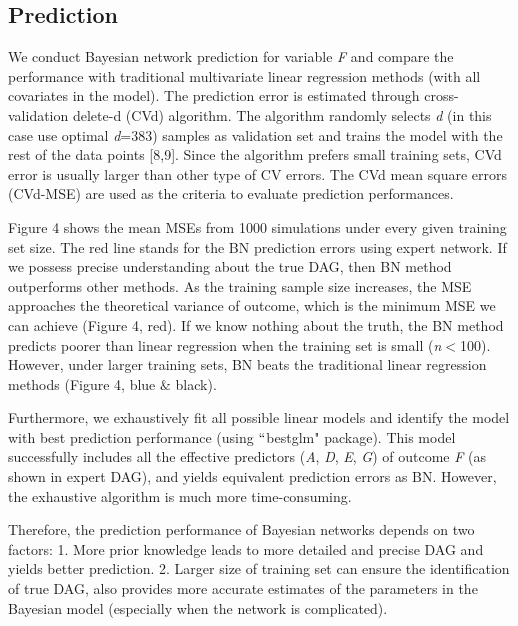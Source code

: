 \documentclass{article}
\begin{document}
\subsection{Prediction}
We conduct Bayesian network prediction for variable \textit{F} and compare the performance with traditional multivariate linear regression methods (with all covariates in the model). The prediction error is estimated through cross-validation delete-d (CVd) algorithm. The algorithm randomly selects \textit{d} (in this case use optimal \textit{d}=383) samples as validation set and trains the model with the rest of the data points [8,9]. Since the algorithm prefers small training sets, CVd error is usually larger than other type of CV errors. The CVd mean square errors (CVd-MSE) are used as the criteria to evaluate prediction performances. \par

Figure 4 shows the mean MSEs from 1000 simulations under every given training set size. The red line stands for the BN prediction errors using expert network. If we possess precise understanding about the true DAG, then BN method outperforms other methods. As the training sample size increases, the MSE approaches the theoretical variance of outcome, which is the minimum MSE we can achieve (Figure 4, red). If we know nothing about the truth, the BN method predicts poorer than linear regression when the training set is small (\textit{n}$<$100). However, under larger training sets, BN beats the traditional linear regression methods (Figure 4, blue $\&$ black). \par

Furthermore, we exhaustively fit all possible linear models and identify the model with best prediction performance (using $``$bestglm" package). This model successfully includes all the effective predictors (\textit{A}, \textit{D}, \textit{E}, \textit{G}) of outcome \textit{F} (as shown in expert DAG), and yields equivalent prediction errors as BN. However, the exhaustive algorithm is much more time-consuming. \par

Therefore, the prediction performance of Bayesian networks depends on two factors: 1. More prior knowledge leads to more detailed and precise DAG and yields better prediction. 2. Larger size of training set can ensure the identification of true DAG, also provides more accurate estimates of the parameters in the Bayesian model (especially when the network is complicated). \par
\end{document}
